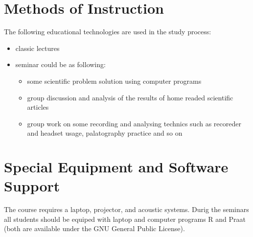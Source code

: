 \documentclass[a4paper]{article}
\begin{document}
\section{Methods of Instruction}
The following educational technologies are used in the study process:
\begin{itemize}
\item classic lectures
\item seminar could be as following:
\begin{itemize}
\item some scientific problem solution using computer programs
\item group discussion and analysis of the results of home readed scientific articles
\item group work on some recording and analysing technics such as recoreder and headset usage, palatography practice and so on
\end{itemize}
\end{itemize}
\section{Special Equipment and Software Support}
The course requires a laptop, projector, and acoustic systems. Durig the seminars all students should be equiped with laptop and computer programs R and Praat (both are available under the GNU General Public License).
\end{document}
